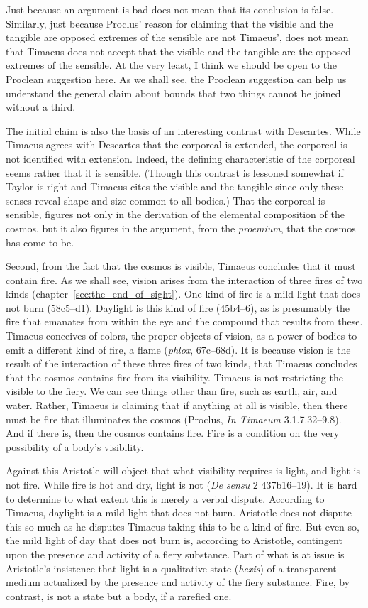 Just because an argument is bad does not mean that its conclusion is false. Similarly, just because Proclus' reason for claiming that the visible and the tangible are opposed extremes of the sensible are not Timaeus', does not mean that Timaeus does not accept that the visible and the tangible are the opposed extremes of the sensible. At the very least, I think we should be open to the Proclean suggestion here. As we shall see, the Proclean suggestion can help us understand the general claim about bounds that two things cannot be joined without a third.

The initial claim is also the basis of an interesting contrast with Descartes. While Timaeus agrees with Descartes that the corporeal is extended, the corporeal is not identified with extension. Indeed, the defining characteristic of the corporeal seems rather that it is sensible. (Though this contrast is lessoned somewhat if Taylor is right and Timaeus cites the visible and the tangible since only these senses reveal shape and size common to all bodies.) That the corporeal is sensible, figures not only in the derivation of the elemental composition of the cosmos, but it also figures in the argument, from the \emph{proemium}, that the cosmos has come to be.

Second, from the fact that the cosmos is visible, Timaeus concludes that it must contain fire. As we shall see, vision arises from the interaction of three fires of two kinds (chapter~\ref{sec:the_end_of_sight}). One kind of fire is a mild light that does not burn (58c5–d1). Daylight is this kind of fire (45b4–6), as is presumably the fire that emanates from within the eye and the compound that results from these. Timaeus conceives of colors, the proper objects of vision, as a power of bodies to emit a different kind of fire, a flame (\emph{phlox}, 67c–68d). It is because vision is the result of the interaction of these three fires of two kinds, that Timaeus concludes that the cosmos contains fire from its visibility. Timaeus is not restricting the visible to the fiery. We can see things other than fire, such as earth, air, and water. Rather, Timaeus is claiming that if anything at all is visible, then there must be fire that illuminates the cosmos (Proclus, \emph{In Timaeum} 3.1.7.32--9.8). And if there is, then the cosmos contains fire. Fire is a condition on the very possibility of a body's visibility.

Against this Aristotle will object that what visibility requires is light, and light is not fire. While fire is hot and dry, light is not (\emph{De sensu} 2 437b16--19). It is hard to determine to what extent this is merely a verbal dispute. According to Timaeus, daylight is a mild light that does not burn. Aristotle does not dispute this so much as he disputes Timaeus taking this to be a kind of fire. But even so, the mild light of day that does not burn is, according to Aristotle, contingent upon the presence and activity of a fiery substance. Part of what is at issue is Aristotle's insistence that light is a qualitative state (\emph{hexis}) of a transparent medium actualized by the presence and activity of the fiery substance. Fire, by contrast, is not a state but a body, if a rarefied one.

